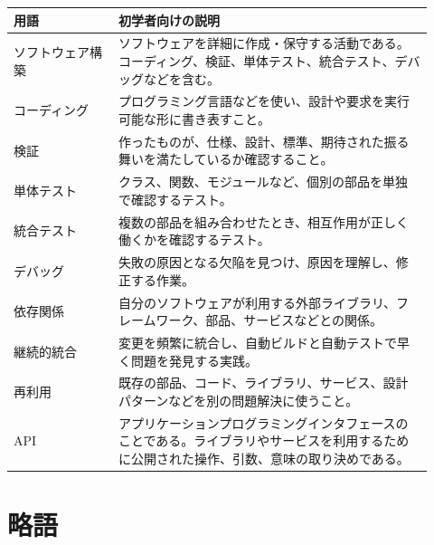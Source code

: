 \documentclass[a4paper,11pt,ja=standard,xelatex]{bxjsarticle}
\begin{document}
\begin{longtable}{L{0.23\linewidth}L{0.69\linewidth}}
\toprule
\textbf{用語} & \textbf{初学者向けの説明} \\
\midrule
ソフトウェア構築 & ソフトウェアを詳細に作成・保守する活動である。コーディング、検証、単体テスト、統合テスト、デバッグなどを含む。 \\
コーディング & プログラミング言語などを使い、設計や要求を実行可能な形に書き表すこと。 \\
検証 & 作ったものが、仕様、設計、標準、期待された振る舞いを満たしているか確認すること。 \\
単体テスト & クラス、関数、モジュールなど、個別の部品を単独で確認するテスト。 \\
統合テスト & 複数の部品を組み合わせたとき、相互作用が正しく働くかを確認するテスト。 \\
デバッグ & 失敗の原因となる欠陥を見つけ、原因を理解し、修正する作業。 \\
依存関係 & 自分のソフトウェアが利用する外部ライブラリ、フレームワーク、部品、サービスなどとの関係。 \\
継続的統合 & 変更を頻繁に統合し、自動ビルドと自動テストで早く問題を発見する実践。 \\
再利用 & 既存の部品、コード、ライブラリ、サービス、設計パターンなどを別の問題解決に使うこと。 \\
API & アプリケーションプログラミングインタフェースのことである。ライブラリやサービスを利用するために公開された操作、引数、意味の取り決めである。 \\
\bottomrule
\end{longtable}

\section*{略語}
\end{document}
